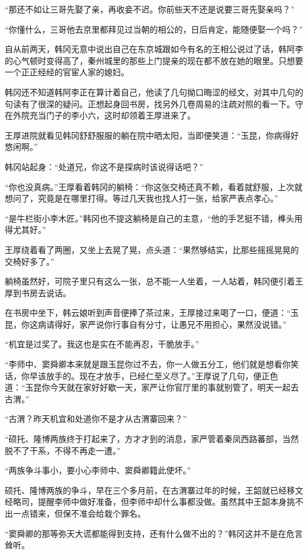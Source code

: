 “那还不如让三哥先娶了亲，再收妾不迟。你前些天不还是说要三哥先娶亲吗？”

“你懂什么，三哥他去京里都拜见过当朝的相公的，日后肯定，能随便娶一个吗？”

自从前两天，韩冈无意中说出自己在东京城跟如今有名的王相公说过了话，韩阿李的心气顿时变得高了，秦州城里的那些上门提亲的现在都不放在她的眼里。只想要一个正正经经的官宦人家的媳妇。

韩冈还不知道韩阿李正在算计着自己，他读了几句拗口晦涩的经文，对其中几句的句读有了很深的疑问。正想起身回书房，找另外几卷周易的注疏对照的看一下。守在外院充当门子的李小六，这时却领着王厚进来了。

王厚进院就看见韩冈舒舒服服的躺在院中晒太阳，当即便笑道：“玉昆，你病得好悠闲啊。”

韩冈站起身：“处道兄，你这不是探病时该说得话吧？”

“你也没真病。”王厚看着韩冈的躺椅：“你这张交椅还真不赖，看着就舒服，上次就想问了，究竟是在哪里打得。等过几天我也找人打一张，给家严表点孝心。”

“是牛栏街小李木匠。”韩冈也不提这躺椅是自己的主意，“他的手艺挺不错，榫头用得尤其好。”

王厚绕着看了两圈，又坐上去晃了晃，点头道：“果然够结实，比那些摇摇晃晃的交椅好多了。”

躺椅虽然好，可院子里只有这么一张，总不能一人坐着，一人站着，韩冈便引着王厚到书房去说话。

在书房中坐下，韩云娘听到声音便捧了茶过来，王厚接过来喝了一口，便道：“玉昆，你这病请得好，家严说你行事自有分寸，让愚兄不用担心，果然没说错。”

“机宜是过奖了。我这也是实在不能再忍，干脆放手。”

“李师中、窦舜卿本来就是跟玉昆你过不去，你一人做五分工，他们就是想看你笑话，你早该放手的。现在才放手，已经仁至义尽了。”王厚说了几句，便正色道：“玉昆你今天就在家好好歇一天，家严让你官厅里的事就别管了，明天一起去古渭。”

“古渭？昨天机宜和处道你不是才从古渭寨回来？”

“硕托、隆博两族终于打起来了，方才才到的消息，家严管着秦凤西路蕃部，当然脱不了干系，不得不再走一遭。”

“两族争斗事小，要小心李师中、窦舜卿籍此使坏。”

硕托、隆博两族的争斗，早在三个多月前，在古渭寨过年的时候，王韶就已经移文经略司，提醒李师中做好准备，但李师中却什么事都没做。虽然其中王韶本身挑不出一点错来，但保不准会给栽个罪名。

“窦舜卿的那等弥天大谎都能得到支持，还有什么做不出的？”韩冈这并不是在危言耸听。

